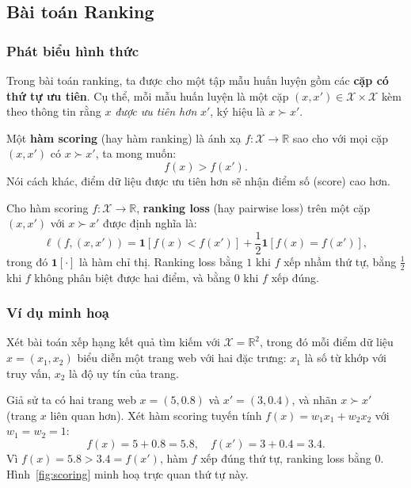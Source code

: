 \subsection{Bài toán Ranking}
\label{sec:problem}

\subsubsection{Phát biểu hình thức}

Trong bài toán ranking, ta được cho một tập mẫu huấn luyện gồm 
các \textbf{cặp có thứ tự ưu tiên}. Cụ thể, mỗi mẫu huấn luyện 
là một cặp $(x, x') \in \mathcal{X} \times \mathcal{X}$ kèm theo 
thông tin rằng $x$ \textit{được ưu tiên hơn} $x'$, ký hiệu là 
$x \succ x'$.

\begin{definition}
Một \textbf{hàm scoring} (hay hàm ranking) là ánh xạ 
$f: \mathcal{X} \to \mathbb{R}$ sao cho với mọi cặp 
$(x, x')$ có $x \succ x'$, ta mong muốn:
\[
  f(x) > f(x').
\]
Nói cách khác, điểm dữ liệu được ưu tiên hơn sẽ nhận điểm số 
(score) cao hơn.
\end{definition}

\begin{definition}
\label{def:rankingloss}
Cho hàm scoring $f: \mathcal{X} \to \mathbb{R}$, 
\textbf{ranking loss} (hay pairwise loss) trên một cặp 
$(x, x')$ với $x \succ x'$ được định nghĩa là:
\[
  \ell(f, (x, x')) = \mathbf{1}[f(x) < f(x')] 
  + \frac{1}{2}\mathbf{1}[f(x) = f(x')],
\]
trong đó $\mathbf{1}[\cdot]$ là hàm chỉ thị. Ranking loss 
bằng $1$ khi $f$ xếp nhầm thứ tự, bằng $\frac{1}{2}$ khi 
$f$ không phân biệt được hai điểm, và bằng $0$ khi $f$ 
xếp đúng.
\end{definition}

\subsubsection{Ví dụ minh hoạ}

\begin{example}
Xét bài toán xếp hạng kết quả tìm kiếm với 
$\mathcal{X} = \mathbb{R}^2$, trong đó mỗi điểm dữ liệu 
$x = (x_1, x_2)$ biểu diễn một trang web với hai đặc trưng: 
$x_1$ là số từ khớp với truy vấn, $x_2$ là độ uy tín của trang.

Giả sử ta có hai trang web $x = (5, 0.8)$ và $x' = (3, 0.4)$, 
và nhãn $x \succ x'$ (trang $x$ liên quan hơn). Xét hàm scoring 
tuyến tính $f(x) = w_1 x_1 + w_2 x_2$ với $w_1 = w_2 = 1$:
\[
  f(x) = 5 + 0.8 = 5.8, \quad f(x') = 3 + 0.4 = 3.4.
\]
Vì $f(x) = 5.8 > 3.4 = f(x')$, hàm $f$ xếp đúng thứ tự, 
ranking loss bằng $0$.
Hình~\ref{fig:scoring} minh hoạ trực quan thứ tự này.
\end{example}

